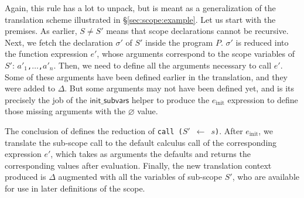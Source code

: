 \documentclass[11pt,a4paper]{article}
\newcommand{\sref}[1]{\S\ref{sec:#1}}
\newcommand{\synvar}[1]{\ensuremath{#1}}
\newcommand{\synkeyword}[1]{\textcolor{red!60!black}{\texttt{#1}}}
\newcommand{\synpunct}[1]{\textcolor{black!40!white}{\texttt{#1}}}
\newcommand{\syncall}{\synkeyword{call~}}
\newcommand{\synlparen}{\synpunct{(}}
\newcommand{\synrparen}{\synpunct{)}}
\newcommand{\synemptydefault}{\synvar{\varnothing}}
\newcommand{\synlarrow}{~\synpunct{$\leftarrow$}~}
\newcommand{\synellipsis}{\synpunct{,$\ldots$,}}
\newcommand{\redctx}[1]{\textcolor{green!50!black}{\ensuremath{#1}}}
\newcommand{\redinit}{\redctx{\mathsf{init\_subvars}}}
\begin{document}
Again, this rule has a lot to unpack, but is meant as a generalization of the 
translation scheme illustrated in \sref{scope:example}. Let us start with 
the premises. As earlier, $S\neq S'$ means that scope declarations cannot be 
recursive. Next, we fetch the declaration \synvar{\sigma'} of \synvar{S'} inside 
the program $P$. \synvar{\sigma'} is reduced into the function expression \synvar{e'},
whose arguments correspond to the scope variables of \synvar{S'}: 
\synvar{a'_1}\synellipsis\synvar{a'_n}. Then, we need to define all the arguments 
necessary to call \synvar{e'}. Some of these arguments have been defined earlier 
in the translation, and they were added to \redctx{\Delta}. But some arguments 
may not have been defined yet, and is its precisely the job of the \redinit{} 
helper to produce the \synvar{e_\mathrm{init}} expression to define those 
missing arguments with the \synemptydefault{} value.

The conclusion of  defines the reduction of 
\syncall\synlparen\synvar{S'}\synlarrow\synvar{s}\synrparen. After \synvar{e_\mathrm{init}},
we translate the sub-scope call to the default calculus call of the corresponding expression \synvar{e'},
which takes as arguments the defaults and returns the corresponding values after 
evaluation. Finally, the new translation context produced is \redctx{\Delta}
augmented with all the variables of sub-scope \synvar{S'}, who are available 
for use in later definitions of the scope.
\end{document}
